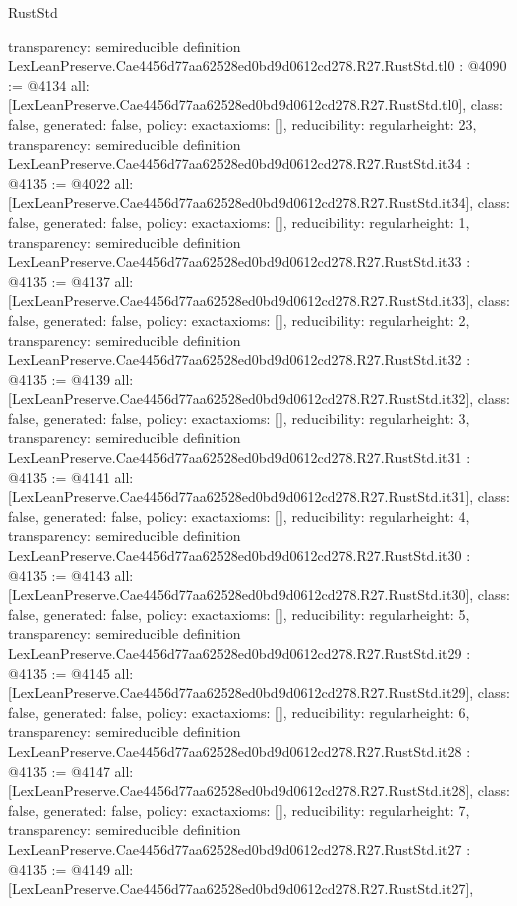 \begin{lexlean}{RustStd}
\begin{coremodule}
{  transparency: semireducible
}
definition LexLeanPreserve.Cae4456d77aa62528ed0bd9d0612cd278.R27.RustStd.tl0 : @4090 := @4134 {
  all: [LexLeanPreserve.Cae4456d77aa62528ed0bd9d0612cd278.R27.RustStd.tl0],
  class: false,
  generated: false,
  policy: exact{axioms: []},
  reducibility: regular{height: 23},
  transparency: semireducible
}
definition LexLeanPreserve.Cae4456d77aa62528ed0bd9d0612cd278.R27.RustStd.it34 : @4135 := @4022 {
  all: [LexLeanPreserve.Cae4456d77aa62528ed0bd9d0612cd278.R27.RustStd.it34],
  class: false,
  generated: false,
  policy: exact{axioms: []},
  reducibility: regular{height: 1},
  transparency: semireducible
}
definition LexLeanPreserve.Cae4456d77aa62528ed0bd9d0612cd278.R27.RustStd.it33 : @4135 := @4137 {
  all: [LexLeanPreserve.Cae4456d77aa62528ed0bd9d0612cd278.R27.RustStd.it33],
  class: false,
  generated: false,
  policy: exact{axioms: []},
  reducibility: regular{height: 2},
  transparency: semireducible
}
definition LexLeanPreserve.Cae4456d77aa62528ed0bd9d0612cd278.R27.RustStd.it32 : @4135 := @4139 {
  all: [LexLeanPreserve.Cae4456d77aa62528ed0bd9d0612cd278.R27.RustStd.it32],
  class: false,
  generated: false,
  policy: exact{axioms: []},
  reducibility: regular{height: 3},
  transparency: semireducible
}
definition LexLeanPreserve.Cae4456d77aa62528ed0bd9d0612cd278.R27.RustStd.it31 : @4135 := @4141 {
  all: [LexLeanPreserve.Cae4456d77aa62528ed0bd9d0612cd278.R27.RustStd.it31],
  class: false,
  generated: false,
  policy: exact{axioms: []},
  reducibility: regular{height: 4},
  transparency: semireducible
}
definition LexLeanPreserve.Cae4456d77aa62528ed0bd9d0612cd278.R27.RustStd.it30 : @4135 := @4143 {
  all: [LexLeanPreserve.Cae4456d77aa62528ed0bd9d0612cd278.R27.RustStd.it30],
  class: false,
  generated: false,
  policy: exact{axioms: []},
  reducibility: regular{height: 5},
  transparency: semireducible
}
definition LexLeanPreserve.Cae4456d77aa62528ed0bd9d0612cd278.R27.RustStd.it29 : @4135 := @4145 {
  all: [LexLeanPreserve.Cae4456d77aa62528ed0bd9d0612cd278.R27.RustStd.it29],
  class: false,
  generated: false,
  policy: exact{axioms: []},
  reducibility: regular{height: 6},
  transparency: semireducible
}
definition LexLeanPreserve.Cae4456d77aa62528ed0bd9d0612cd278.R27.RustStd.it28 : @4135 := @4147 {
  all: [LexLeanPreserve.Cae4456d77aa62528ed0bd9d0612cd278.R27.RustStd.it28],
  class: false,
  generated: false,
  policy: exact{axioms: []},
  reducibility: regular{height: 7},
  transparency: semireducible
}
definition LexLeanPreserve.Cae4456d77aa62528ed0bd9d0612cd278.R27.RustStd.it27 : @4135 := @4149 {
  all: [LexLeanPreserve.Cae4456d77aa62528ed0bd9d0612cd278.R27.RustStd.it27],
}
\end{coremodule}
\end{lexlean}
